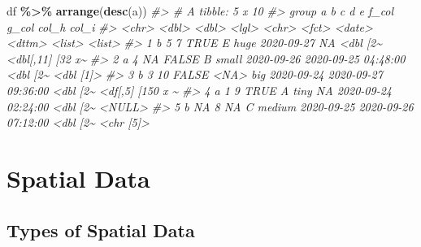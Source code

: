 \documentclass[
]{report}
\newenvironment{Shaded}{\begin{snugshade}}{\end{snugshade}}
\newcommand{\CommentTok}[1]{\textcolor[rgb]{0.56,0.35,0.01}{\textit{#1}}}
\newcommand{\KeywordTok}[1]{\textcolor[rgb]{0.13,0.29,0.53}{\textbf{#1}}}
\newcommand{\NormalTok}[1]{#1}
\newcommand{\OperatorTok}[1]{\textcolor[rgb]{0.81,0.36,0.00}{\textbf{#1}}}
\newcommand{\StringTok}[1]{\textcolor[rgb]{0.31,0.60,0.02}{#1}}
\begin{document}
\begin{Shaded}
\begin{Highlighting}[]
\NormalTok{df }\OperatorTok{\%\textgreater{}\%}
\StringTok{  }\KeywordTok{arrange}\NormalTok{(}\KeywordTok{desc}\NormalTok{(a))}
\CommentTok{\#\textgreater{} \# A tibble: 5 x 10}
\CommentTok{\#\textgreater{}   group     a     b c     d     e      f\_col      g\_col               col\_h    col\_i           }
\CommentTok{\#\textgreater{}   \textless{}chr\textgreater{} \textless{}dbl\textgreater{} \textless{}dbl\textgreater{} \textless{}lgl\textgreater{} \textless{}chr\textgreater{} \textless{}fct\textgreater{}  \textless{}date\textgreater{}     \textless{}dttm\textgreater{}              \textless{}list\textgreater{}   \textless{}list\textgreater{}          }
\CommentTok{\#\textgreater{} 1 b         5     7 TRUE  E     huge   2020{-}09{-}27 NA                  \textless{}dbl [2\textasciitilde{} \textless{}dbl[,11] [32 x\textasciitilde{}}
\CommentTok{\#\textgreater{} 2 a         4    NA FALSE B     small  2020{-}09{-}26 2020{-}09{-}25 04:48:00 \textless{}dbl [2\textasciitilde{} \textless{}dbl [1]\textgreater{}       }
\CommentTok{\#\textgreater{} 3 b         3    10 FALSE \textless{}NA\textgreater{}  big    2020{-}09{-}24 2020{-}09{-}27 09:36:00 \textless{}dbl [2\textasciitilde{} \textless{}df[,5] [150 x \textasciitilde{}}
\CommentTok{\#\textgreater{} 4 a         1     9 TRUE  A     tiny   NA         2020{-}09{-}24 02:24:00 \textless{}dbl [2\textasciitilde{} \textless{}NULL\textgreater{}          }
\CommentTok{\#\textgreater{} 5 b        NA     8 NA    C     medium 2020{-}09{-}25 2020{-}09{-}26 07:12:00 \textless{}dbl [2\textasciitilde{} \textless{}chr [5]\textgreater{}}
\end{Highlighting}
\end{Shaded}

\cleardoublepage

\hypertarget{part-spatial-data}{%
\part{Spatial Data}\label{part-spatial-data}}

\hypertarget{types-of-spatial-data}{%
\chapter{Types of Spatial Data}\label{types-of-spatial-data}}
\end{document}
